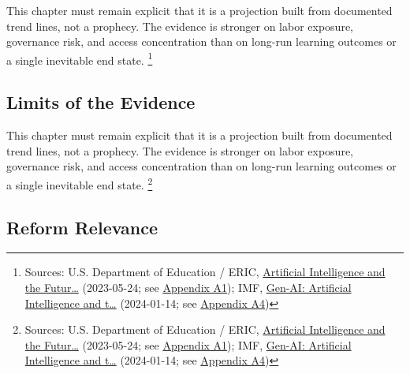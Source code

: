 \documentclass[
  american,
  11pt,
  letterpaper,
]{article}
\begin{document}
This chapter must remain explicit that it is a projection built from
documented trend lines, not a prophecy. The evidence is stronger on
labor exposure, governance risk, and access concentration than on
long-run learning outcomes or a single inevitable end state. \footnote{Sources:
  U.S. Department of Education / ERIC,
  \href{https://eric.ed.gov/?id=ED631097}{Artificial Intelligence and
  the Futur\ldots{}} (2023-05-24; see
  \hyperref[appendix-a1-artificial-intelligence-and-the-future-of-teaching-and-learning-insights-and-recommendations]{Appendix
  A1}); IMF,
  \href{https://www.imf.org/en/publications/staff-discussion-notes/issues/2024/01/14/gen-ai-artificial-intelligence-and-the-future-of-work-542379}{Gen-AI:
  Artificial Intelligence and t\ldots{}} (2024-01-14; see
  \hyperref[appendix-a4-gen-ai-artificial-intelligence-and-the-future-of-work]{Appendix
  A4})}

\subsection{Limits of the Evidence}\label{limits-of-the-evidence}

This chapter must remain explicit that it is a projection built from
documented trend lines, not a prophecy. The evidence is stronger on
labor exposure, governance risk, and access concentration than on
long-run learning outcomes or a single inevitable end state. \footnote{Sources:
  U.S. Department of Education / ERIC,
  \href{https://eric.ed.gov/?id=ED631097}{Artificial Intelligence and
  the Futur\ldots{}} (2023-05-24; see
  \hyperref[appendix-a1-artificial-intelligence-and-the-future-of-teaching-and-learning-insights-and-recommendations]{Appendix
  A1}); IMF,
  \href{https://www.imf.org/en/publications/staff-discussion-notes/issues/2024/01/14/gen-ai-artificial-intelligence-and-the-future-of-work-542379}{Gen-AI:
  Artificial Intelligence and t\ldots{}} (2024-01-14; see
  \hyperref[appendix-a4-gen-ai-artificial-intelligence-and-the-future-of-work]{Appendix
  A4})}

\subsection{Reform Relevance}\label{reform-relevance}
\end{document}

